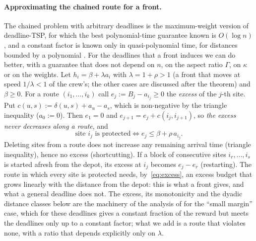 \documentclass[pdflatex,sn-mathphys-ay]{sn-jnl}
\theoremstyle{thmstyleone}
\theoremstyle{thmstyletwo}
\theoremstyle{thmstylethree}
\begin{document}
\paragraph{Approximating the chained route for a front.} The chained
problem with arbitrary deadlines is the maximum-weight version of
deadline-TSP, for which the best polynomial-time guarantee known is
$O(\log n)$ \citep{bansal2004}, and a constant factor is known only in
quasi-polynomial time, for distances bounded by a polynomial
\citep{friggstad2021}. For the deadlines that a front
induces we can do better, with a guarantee that does not depend on $n$,
on the aspect ratio $\Gamma$, on $\kappa$ or on the weights. Let
$h_i=\beta+\lambda a_i$ with $\lambda=1+\rho>1$ (a front that moves at
speed $1/\lambda<1$ of the crew's; the other cases are discussed after the
theorem) and $\beta\ge0$. For a route $(i_1,\dots,i_k)$ call
$e_j:=B_j-a_{i_j}\ge0$ the \emph{excess} of the $j$-th site. Put
$c(u,s):=\delta(u,s)+a_u-a_s$, which is non-negative by the triangle
inequality ($a_0:=0$). Then $e_1=0$ and $e_{j+1}=e_j+c(i_j,i_{j+1})$, so
\emph{the excess never decreases along a route}, and
\begin{equation}\label{eq:excess}
\text{site } i_j \text{ is protected}\iff e_j\le\beta+\rho\,a_{i_j}.
\end{equation}
Deleting sites from a route does not increase any remaining arrival
time (triangle inequality), hence no excess (shortcutting). If a block of
consecutive sites $i_r,\dots,i_s$ is started afresh from the depot, its excess
at $i_j$ becomes $e_j-e_r$ (restarting). The route in which every
site is protected needs, by~\eqref{eq:excess}, an excess budget that grows
linearly with the distance from the depot: this is what a front gives, and
what a general deadline does not. The excess, its monotonicity and the
dyadic distance classes below are the machinery of the analysis of
\citet{bansal2004} for the ``small margin'' case, which for these deadlines
gives a constant fraction of the reward but meets the deadlines only up to a
constant factor; what we add is a route that violates none, with a ratio that
depends explicitly only on $\lambda$.
\end{document}
